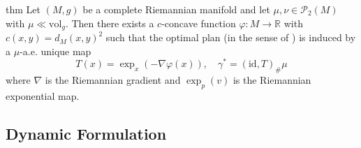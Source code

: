 \documentclass[11pt]{article}
\newcommand{\man}{M}
\begin{document}
\begin{restatable}{thm}{} \label{brenier-mcann}
    Let $(M, g)$ be a complete Riemannian manifold and let $\mu, \nu \in \mathcal{P}_2(\man)$ with $\mu \ll \text{vol}_g$. Then there exists a $c$-concave function $\varphi: \man \rightarrow \mathbb{R}$ with $c(x,y) = d_M(x,y)^2$ such that the optimal plan (in the sense of ) is induced by a $\mu$-a.e. unique map
    \[T(x) = \exp_x\left(-\nabla\varphi(x)\right), \quad \gamma^* = (\text{id}, T)_\# \mu\]
    where $\nabla$ is the Riemannian gradient and $\exp_p(v)$ is the Riemannian exponential map.
\end{restatable}

\subsection{Dynamic Formulation}
\end{document}
